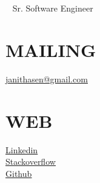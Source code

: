 \documentclass[]{cv-class}
\begin{document}
\begin{aside}
\color{blue}
  \section{}
  	\vspace{0.5cm}
   ~  
      {Sr. Software Engineer}
   ~
  \section{MAILING}
    \underline{\href{mailto:janithasen@gmail.com}{{\whitebodyfont janithasen@gmail.com}}}
    ~
  \section{WEB}
  	\vspace{0.10cm}
    \underline{\href{https://www.linkedin.com/in/janithamadushan}{{\whitebodyfont Linkedin}}}
    \\
	\vspace{0.10cm}
    \underline{\href{https://stackoverflow.com/users/4412223/janitha-madushan}{{\whitebodyfont Stackoverflow}}}
	\\	
	\vspace{0.10cm}
    \underline{\href{https://github.com/janitham}{{\whitebodyfont Github}}}
    ~

\end{aside}
\end{document}
